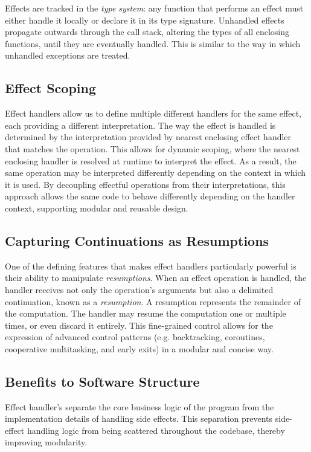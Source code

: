 \documentclass[logo,bsc,singlespacing,parskip]{infthesis}
\begin{document}
Effects are tracked in the \textit{type system}: any function that performs an effect must either handle it locally or declare it in its type signature. Unhandled effects propagate outwards through the call stack, altering the types of all enclosing functions, until they are eventually handled. This is similar to the way in which unhandled exceptions are treated.


\subsection{Effect Scoping}
Effect handlers allow us to define multiple different handlers for the same effect, each providing a different interpretation. The way the effect is handled is determined by the interpretation provided by nearest enclosing effect handler that matches the operation. This allows for dynamic scoping, where the nearest enclosing handler is resolved at runtime to interpret the effect. As a result, the same operation may be interpreted differently depending on the context in which it is used. By decoupling effectful operations from their interpretations, this approach allows the same code to behave differently depending on the handler context, supporting modular and reusable design.



\subsection{Capturing Continuations as Resumptions}
One of the defining features that makes effect handlers particularly powerful is their ability to manipulate \textit{resumptions}. When an effect operation is handled, the handler receives not only the operation’s arguments but also a delimited continuation, known as a \textit{resumption}. A resumption represents the remainder of the computation. The handler may resume the computation one or multiple times, or even discard it entirely. This fine-grained control allows for the expression of advanced control patterns (e.g. backtracking, coroutines, cooperative multitasking, and early exits) in a modular and concise way.

\subsection{Benefits to Software Structure}

Effect handler’s separate the core business logic of the program from the implementation details of handling side effects. This separation prevents side-effect handling logic from being scattered throughout the codebase, thereby improving modularity. 
\end{document}

